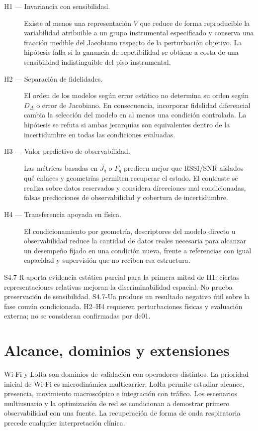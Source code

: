 \begin{description}
\item[H1 --- Invariancia con sensibilidad.] Existe al menos una representación $V$ que reduce de forma reproducible la variabilidad atribuible a un grupo instrumental especificado y conserva una fracción medible del Jacobiano respecto de la perturbación objetivo. La hipótesis falla si la ganancia de repetibilidad se obtiene a costa de una sensibilidad indistinguible del piso instrumental.

\item[H2 --- Separación de fidelidades.] El orden de los modelos según error estático no determina su orden según $D_\Delta$ o error de Jacobiano. En consecuencia, incorporar fidelidad diferencial cambia la selección del modelo en al menos una condición controlada. La hipótesis se refuta si ambas jerarquías son equivalentes dentro de la incertidumbre en todas las condiciones evaluadas.

\item[H3 --- Valor predictivo de observabilidad.] Las métricas basadas en $J_q$ o $F_q$ predicen mejor que RSSI/SNR aislados qué enlaces y geometrías permiten recuperar el estado. El contraste se realiza sobre datos reservados y considera direcciones mal condicionadas, falsas predicciones de observabilidad y cobertura de incertidumbre.

\item[H4 --- Transferencia apoyada en física.] El condicionamiento por geometría, descriptores del modelo directo u observabilidad reduce la cantidad de datos reales necesaria para alcanzar un desempeño fijado en una condición nueva, frente a referencias con igual capacidad y supervisión que no reciben esa estructura.
\end{description}

S4.7-R aporta evidencia estática parcial para la primera mitad de H1: ciertas representaciones relativas mejoran la discriminabilidad espacial. No prueba preservación de sensibilidad. S4.7-Ua produce un resultado negativo útil sobre la fase común condicionada. H2--H4 requieren perturbaciones físicas y evaluación externa; no se consideran confirmadas por dc01.

\section{Alcance, dominios y extensiones}

Wi-Fi y LoRa son dominios de validación con operadores distintos. La prioridad inicial de Wi-Fi es microdinámica multicarrier; LoRa permite estudiar alcance, presencia, movimiento macroscópico e integración con tráfico. Los escenarios multiusuario y la optimización de red se condicionan a demostrar primero observabilidad con una fuente. La recuperación de forma de onda respiratoria precede cualquier interpretación clínica.

